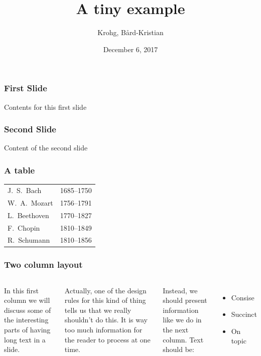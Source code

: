 \documentclass[xcolor=pdftex,dvipsnames,table]{beamer}
\title{A tiny example}
\author{Krohg, Bård-Kristian}
\date{December 6, 2017}
\begin{document}
\maketitle

\begin{frame}
  \frametitle{First Slide}
  Contents for this first slide
\end{frame}

\begin{frame}
  \frametitle{Second Slide}
  Content of the second slide
\end{frame}

\begin{frame}
  \frametitle{A table}
  \begin{center}
    \begin{tabular}{l c}
      J.\ S.\ Bach   & 1685--1750 \\
      W.\ A.\ Mozart & 1756--1791 \\
      L.\ Beethoven  & 1770--1827 \\
      F.\ Chopin     & 1810--1849 \\
      R.\ Schumann   & 1810--1856 \\
    \end{tabular}
  \end{center}
\end{frame}

\begin{frame}
  \frametitle{Two column layout}

  \begin{columns}[c]
    \column{1.5in}
    In this first column we will discuss some of the interesting parts of having long text in a slide.

    Actually, one of the design rules for this kind of thing tells us that we really shouldn't do this. It is way too much information for the reader to process at one time.

    Instead, we should present information like we do in the next column.
    \column{1.5in}
    Text should be:
    \begin{itemize}
    \item Consise
    \item Succinct
    \item On topic
    \end{itemize}
  \end{columns}
\end{frame}
\end{document}
